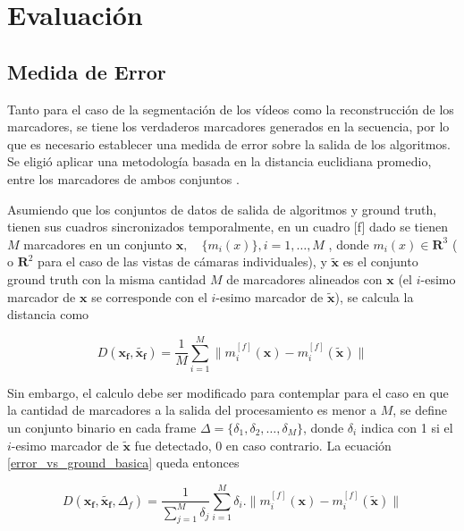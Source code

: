 \section{Evaluación}

\subsection{Medida de Error}
\label{subsec:medida_error}

Tanto para el caso de la segmentación de los vídeos como la reconstrucción de los marcadores, se tiene los verdaderos marcadores generados en la secuencia, por lo que es necesario establecer una medida de error sobre la salida de los algoritmos. Se eligió aplicar una metodología basada en la distancia euclidiana promedio, entre los marcadores de ambos conjuntos \cite{humaneva} . 

Asumiendo que los conjuntos de datos de salida de algoritmos y ground truth, tienen sus cuadros sincronizados temporalmente, en un cuadro [f] dado se tienen $M$ marcadores en un conjunto $ \boldsymbol{x},\quad\{m_{i}(x)\},i=1,\ldots,M $ , donde $ m_{i}(x)\in{\mathbf{R}^{3}} $ ( o $ \mathbf{R}^{2} $ para el caso de las vistas de cámaras individuales), y $ \boldsymbol{\tilde{x}} $ es el conjunto ground truth con la misma cantidad $M$ de marcadores alineados con $\boldsymbol{x}$ (el $i$-esimo marcador de $\boldsymbol{x}$ se corresponde con el  $i$-esimo marcador de $\boldsymbol{\tilde{x}}$), se calcula la distancia como

\begin{equation}
D(\boldsymbol{x_{f}},\boldsymbol{\tilde{x_{f}}})=\frac{1}{M}\sum_{i=1}^{M} \|m_{i}^{[f]}(\boldsymbol{x})-m_{i}^{[f]}(\boldsymbol{\tilde{x}})\|
\label{error_vs_ground_basica}
\end{equation}

Sin embargo, el calculo debe ser modificado para contemplar para el caso en que la cantidad de marcadores a la salida del procesamiento es menor a $M$, se define un conjunto binario en cada frame $\Delta=\{\delta_1,\delta_2,\ldots,\delta_M\}$, donde $\delta_i$ indica con 1 si el $i$-esimo marcador de $\boldsymbol{\tilde{x}}$ fue detectado, 0 en caso contrario. La ecuación \ref{error_vs_ground_basica} queda entonces

\begin{equation}
D(\boldsymbol{x_{f}},\boldsymbol{\tilde{x_{f}}},\Delta_{f})=\frac{1}{\sum_{j=1}^{M} \delta_j} \sum_{i=1}^{M} \delta_i.\|m_{i}^{[f]}(\boldsymbol{x})-m_{i}^{[f]}(\boldsymbol{\tilde{x}})\|
\label{error_vs_ground_deteccion}
\end{equation}

